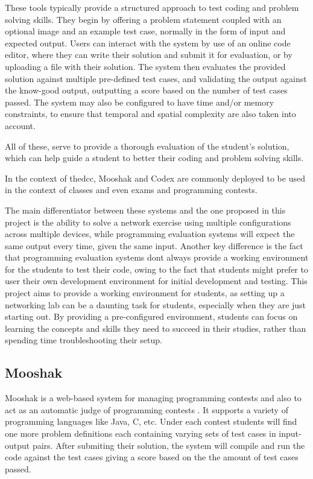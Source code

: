 These tools typically provide a structured approach to test coding and problem solving skills. They begin by offering a
problem statement coupled with an optional image and an example test case, normally in the form of input and expected output.
Users can interact with the system by use of an online code editor, where they can write their solution and submit it for
evaluation, or by uploading a file with their solution. The system then evaluates the provided solution against multiple
pre-defined test cases, and validating the output against the know-good output, outputting a score based on the number of 
test cases passed. The system may also be configured to have time and/or memory constraints, to ensure that temporal and
spatial complexity are also taken into account.

All of these, serve to provide a thorough evaluation of the student's solution, which can help guide a student to better
their coding and problem solving skills.

In the context of the\ac{dcc}, Mooshak and Codex are commonly deployed to be used in the context of classes and 
even exams and programming contests.

The main differentiator between these systems and the one proposed in this project is the ability to solve a network 
exercise using multiple configurations across multiple devices, while programming evaluation systems will expect
the same output every time, given the same input.
Another key difference is the fact that programming evaluation systems dont always provide a working environment for the 
students to test their code, owing to the fact that students might prefer to user their own development environment for 
initial development and testing. This project aims to provide a working environment for students, as setting up a 
networking lab can be a daunting task for students, especially when they are just starting out. By providing a pre-configured
environment, students can focus on learning the concepts and skills they need to succeed in their studies, rather than
spending time troubleshooting their setup.

\subsection{Mooshak}
Mooshak is a web-based system for managing programming contests and also to act as an automatic judge of programming 
contests \cite{Leal2003567}. It supports a variety of programming languages like Java, C, etc. Under each contest students 
will find one more problem definitions each containing varying sets of test cases in input-output pairs. After submiting 
their solution, the system will compile and run the code against the test cases giving a score based on the the amount of 
test cases passed.

